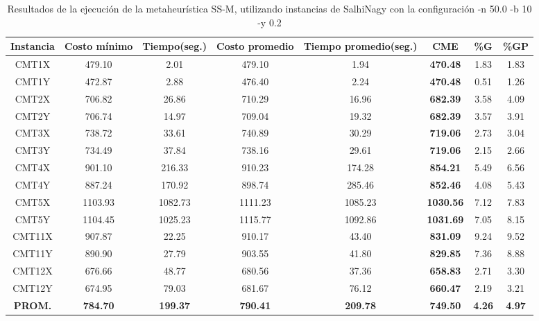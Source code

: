 \begin{table}[h]
\caption{Resultados de la ejecución de la metaheurística SS-M, utilizando instancias de SalhiNagy con la configuración -n 50.0 -b 10 -y 0.2}
\centering
\small
\begin{tabular}{c c c c c c c c}
\hline\hline
Instancia & Costo mínimo & Tiempo(seg.) & Costo promedio & Tiempo promedio(seg.) & CME & \%G & \%GP \\ [0.5ex]
\hline
CMT1X & 479.10 & 2.01 & 
479.10 & 1.94 & \bf{470.48} & 
1.83 & 1.83\\CMT1Y & 472.87 & 2.88 & 
476.40 & 2.24 & \bf{470.48} & 
0.51 & 1.26\\CMT2X & 706.82 & 26.86 & 
710.29 & 16.96 & \bf{682.39} & 
3.58 & 4.09\\CMT2Y & 706.74 & 14.97 & 
709.04 & 19.32 & \bf{682.39} & 
3.57 & 3.91\\CMT3X & 738.72 & 33.61 & 
740.89 & 30.29 & \bf{719.06} & 
2.73 & 3.04\\CMT3Y & 734.49 & 37.84 & 
738.16 & 29.61 & \bf{719.06} & 
2.15 & 2.66\\CMT4X & 901.10 & 216.33 & 
910.23 & 174.28 & \bf{854.21} & 
5.49 & 6.56\\CMT4Y & 887.24 & 170.92 & 
898.74 & 285.46 & \bf{852.46} & 
4.08 & 5.43\\CMT5X & 1103.93 & 1082.73 & 
1111.23 & 1085.23 & \bf{1030.56} & 
7.12 & 7.83\\CMT5Y & 1104.45 & 1025.23 & 
1115.77 & 1092.86 & \bf{1031.69} & 
7.05 & 8.15\\CMT11X & 907.87 & 22.25 & 
910.17 & 43.40 & \bf{831.09} & 
9.24 & 9.52\\CMT11Y & 890.90 & 27.79 & 
903.55 & 41.80 & \bf{829.85} & 
7.36 & 8.88\\CMT12X & 676.66 & 48.77 & 
680.56 & 37.36 & \bf{658.83} & 
2.71 & 3.30\\CMT12Y & 674.95 & 79.03 & 
681.67 & 76.12 & \bf{660.47} & 
2.19 & 3.21\\\bf{PROM.} & 
\bf{784.70} & \bf{199.37} & \bf{790.41} & \bf{209.78} & \bf{749.50} & \bf{4.26} & \bf{4.97}\\[1ex]\hline
\end{tabular}
\label{table:SS-M-50-0.2-S}
\end{table}

